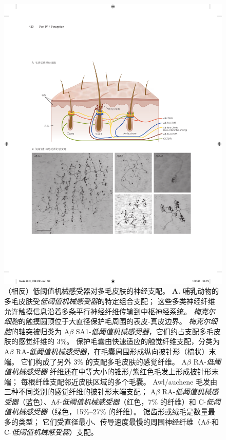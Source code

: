 \begin{figure}[htbp]
	\centering
	\includegraphics[width=1.0\linewidth]{chap18/fig_18_8}
	\caption{（相反）低阈值机械感受器对多毛皮肤的神经支配。
		\textbf{A.} 哺乳动物的多毛皮肤受\textit{低阈值机械感受器}的特定组合支配； 这些多类神经纤维允许触摸信息沿着多条平行神经纤维传输到中枢神经系统。
		\textit{梅克尔细胞}的触摸圆顶位于大直径保护毛周围的表皮-真皮边界。
		\textit{梅克尔细胞}的轴突被归类为 A$\beta$ SA1-\textit{低阈值机械感受器}，它们约占支配多毛皮肤的感觉纤维的 3\%。
		保护毛囊由快速适应的触觉纤维支配，分类为 A$\beta$ RA-\textit{低阈值机械感受器}，在毛囊周围形成纵向披针形（梳状）末端。
		它们构成了另外 3\% 的支配多毛皮肤的感觉纤维。
		A$\beta$ RA-\textit{低阈值机械感受器} 纤维还在中等大小的锥形/紫红色毛发上形成披针形末端； 每根纤维支配邻近皮肤区域的多个毛囊。
		Awl/auchene 毛发由三种不同类别的感觉纤维的披针形末端支配； A$\beta$ RA-\textit{低阈值机械感受器}（蓝色）、A$\delta$-\textit{低阈值机械感受器}（红色，7\% 的纤维）和 C-\textit{低阈值机械感受器}（绿色，15\%–27\% 的纤维）。
		锯齿形或绒毛是数量最多的类型； 它们受直径最小、传导速度最慢的周围神经纤维（A$\delta$-和 C-\textit{低阈值机械感受器}）支配。 
}
\end{figure}

